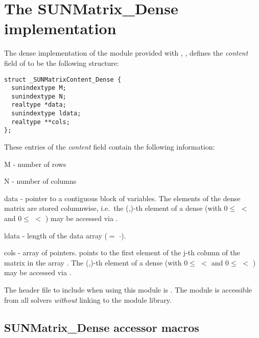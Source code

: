 \section{The SUNMatrix\_Dense implementation}\label{ss:sunmat_dense}

The dense implementation of the {\sunmatrix} module provided with
{\sundials}, {\sunmatdense}, defines the {\em content} field
of  to be the following structure:
\begin{verbatim}
struct _SUNMatrixContent_Dense {
  sunindextype M;
  sunindextype N;
  realtype *data;
  sunindextype ldata;
  realtype **cols;
};
\end{verbatim}
These entries of the \emph{content} field contain the following
information:
\begin{args}[ldata]
  \item[M] - number of rows
  \item[N] - number of columns
  \item[data] - pointer to a contiguous block of  variables.
    The elements of the dense matrix are stored columnwise, i.e.~the
    (,)-th element of a dense {\sunmatrix} 
    (with $0 \le$  $<$  and $ 0 \le$  $<$ )
    may be accessed via .
  \item[ldata] - length of the data array ($=$ $\cdot$).
  \item[cols] - array of pointers.  points to the first
    element of the j-th column of the matrix in the array .
    The (,)-th element of a dense {\sunmatrix} 
    (with $0 \le$  $<$  and $ 0 \le$  $<$ )
    may be accessed via .
\end{args}

\noindent The header file to include when using this module
is . The {\sunmatdense} module
is accessible from all {\sundials} solvers \textit{without}
linking to the \newline
{} module library.


\subsection{SUNMatrix\_Dense accessor macros}
\label{ss:sunmat_dense_macros}

